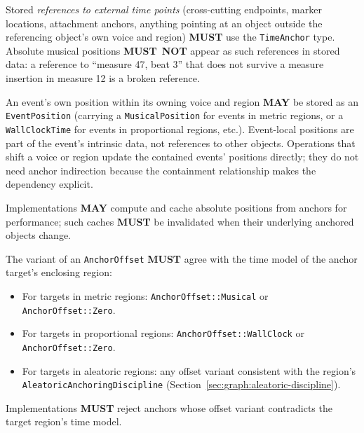 \documentclass[11pt,letterpaper]{report}
\newcounter{requirement}[chapter]
\newcommand{\MUST}{\textbf{MUST}}
\newcommand{\MUSTNOT}{\textbf{MUST}\nobreak\ \textbf{NOT}}
\newcommand{\MAY}{\textbf{MAY}}
\begin{document}
\begin{requirement}
  \label{req:time:anchor-references}
  Stored \emph{references to external time points} (cross-cutting
  endpoints, marker locations, attachment anchors, anything
  pointing at an object outside the referencing object's own
  voice and region) \MUST{} use the \texttt{TimeAnchor} type.
  Absolute musical positions \MUSTNOT{} appear as such references
  in stored data: a reference to ``measure 47, beat 3'' that does
  not survive a measure insertion in measure 12 is a broken
  reference.

  An event's own position within its owning voice and region
  \MAY{} be stored as an \texttt{EventPosition} (carrying a
  \texttt{MusicalPosition} for events in metric regions, or a
  \texttt{WallClockTime} for events in proportional regions,
  etc.). Event-local positions are part of the event's intrinsic
  data, not references to other objects. Operations that shift a
  voice or region update the contained events' positions
  directly; they do not need anchor indirection because the
  containment relationship makes the dependency explicit.

  Implementations \MAY{} compute and cache absolute positions
  from anchors for performance; such caches \MUST{} be
  invalidated when their underlying anchored objects change.
\end{requirement}

\begin{requirement}
  \label{req:time:anchor-offset-kind}
  The variant of an \texttt{AnchorOffset} \MUST{} agree with the
  time model of the anchor target's enclosing region:

  \begin{itemize}
    \item For targets in metric regions: \texttt{AnchorOffset::Musical}
      or \texttt{AnchorOffset::Zero}.
    \item For targets in proportional regions:
      \texttt{AnchorOffset::WallClock} or \texttt{AnchorOffset::Zero}.
    \item For targets in aleatoric regions: any offset variant
      consistent with the region's
      \texttt{AleatoricAnchoringDiscipline}
      (Section~\ref{sec:graph:aleatoric-discipline}).
  \end{itemize}

  Implementations \MUST{} reject anchors whose offset variant
  contradicts the target region's time model.
\end{requirement}
\end{document}
